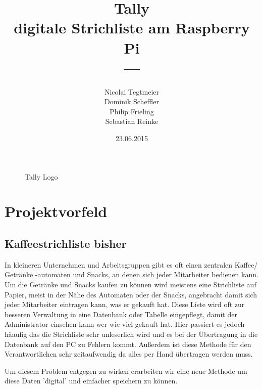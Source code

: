 \documentclass[11pt,a4paper]{article} %
\title{\normalfont\bfseries{Tally\\ digitale Strichliste am Raspberry Pi}\\---}
\author{Nicolai Tegtmeier \\ Dominik Scheffler \\ Philip Frieling \\ Sebastian Reinke}
\date{23.06.2015}
\begin{document}



\begin{titlepage}
	\maketitle
	\begin{figure}[h]
	\caption{Tally Logo}
	\end{figure}
\end{titlepage}

\tableofcontents
\newpage

\section{Projektvorfeld}
\label{Grundlagen}


\subsection{Kaffeestrichliste bisher}

In kleineren Unternehmen und Arbeitsgruppen gibt es oft einen zentralen Kaffee/ Getränke -automaten und Snacks, an denen sich jeder Mitarbeiter bedienen kann. Um die Getränke und Snacks kaufen zu können wird meistens eine Strichliste auf Papier, meist in der Nähe des Automaten oder der Snacks, angebracht damit sich jeder Mitarbeiter eintragen kann, was er gekauft hat. Diese Liste wird oft zur besseren Verwaltung in eine Datenbank oder Tabelle eingepflegt, damit der Administrator einsehen kann wer wie viel gekauft hat. Hier passiert es jedoch häaufig das die Strichliste sehr unleserlich wird und es bei der Übertragung in die Datenbank auf den PC zu Fehlern kommt. Außerdem ist diese Methode für den Verantwortlichen sehr zeitaufwendig da alles per Hand übertragen werden muss.
\par
Um diesem Problem entgegen zu wirken erarbeiten wir eine neue Methode um diese Daten 'digital' und einfacher speichern zu k\"onnen.
\end{document}
